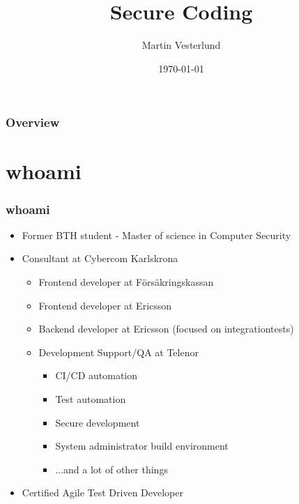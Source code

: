 \documentclass{beamer}
\title[Secure Coding]{Secure Coding }
\author{Martin Vesterlund}
\institute[Cybercom]
{
Cybercom Group AB \\
\medskip
\textit{martin.vesterlund@cybercom.com}
}
\date{\today}
\begin{document}
\begin{frame}
  \titlepage %
\end{frame}

\begin{frame}
  \frametitle{Overview}
  \tableofcontents
\end{frame}

\section{whoami}
\begin{frame}
  \frametitle{whoami}
  \begin{itemize}
    \item Former BTH student - Master of science in Computer Security
    \item Consultant at Cybercom Karlskrona
    \begin{itemize}
      \item Frontend developer at Försäkringskassan
      \item Frontend developer at Ericsson
      \item Backend developer at Ericsson (focused on integrationtests)
      \item Development Support/QA at Telenor
      \begin{itemize}
        \item CI/CD automation
        \item Test automation
        \item Secure development
        \item System administrator build environment
        \item ...and a lot of other things
      \end{itemize}
    \end{itemize}
    \item Certified Agile Test Driven Developer
  \end{itemize}
\end{frame}
\end{document}
